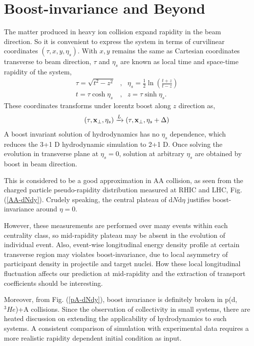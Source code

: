 \documentclass[aps,prl,twocolumn,groupedaddress]{revtex4-1}
\begin{document}
\section{Boost-invariance and Beyond}
	The matter produced in heavy ion collision expand rapidity in the beam direction. So it is convenient to express the system in terms of curvilinear coordinates $(\tau, x, y, \eta_s)$. 
	With $x, y$ remains the same as Cartesian coordinates transverse to beam direction, $\tau$ and $\eta_s$ are known as local time and space-time rapidity of the system,
	\begin{eqnarray}
		\tau = \sqrt{t^2 - z^2} &,& \eta_s = \frac{1}{2}\ln\left(\frac{t+z}{t-z}\right) \\
		t = \tau \cosh \eta_s &,& z = \tau \sinh \eta_s.
	\end{eqnarray}
	These coordinates transforms under lorentz boost along $z$ direction as,
	\begin{eqnarray}
		(\tau, {\bf x_{\perp}}, \eta_s) \xrightarrow{L} (\tau, {\bf x_{\perp}}, \eta_s + \Delta)
	\end{eqnarray}
	A boost invariant solution of hydrodynamics has no $\eta_s$ dependence, which reduces the 3+1 D hydrodynamic simulation to 2+1 D. 
	Once solving the evolution in transverse plane at $\eta_s = 0$, solution at arbitrary $\eta_s$ are obtained by boost in beam direction.
	
	This is considered to be a good approximation in AA collision, as seen from the charged particle pseudo-rapidity distribution measured at RHIC and LHC, Fig. (\ref{AA-dNdy}). 
	Crudely speaking, the central plateau of $\mathrm{d}N\mathrm{d}\eta$ justifies boost-invariance around $\eta = 0$. 
	
	However, these measurements are performed over many events within each centrality class, so mid-rapidity plateau may be absent in the evolution of individual event.
	Also, event-wise longitudinal energy density profile at certain transverse region may violates boost-invariance, due to local asymmetry of participant density in projectile and target nuclei. 
	How these local longitudinal fluctuation affects our prediction at mid-rapidity and the extraction of transport coefficients should be interesting.
	
	Moreover, from Fig. (\ref{pA-dNdy}), boost invariance is definitely broken in p(d, ${}^3He$)+A collisions.
	Since the observation of collectivity in small systems, there are heated discussion on extending the applicability of hydrodynamics to such systems.
	A consistent comparison of simulation with experimental data requires a more realistic rapidity dependent initial condition as input.
	
\end{document}
